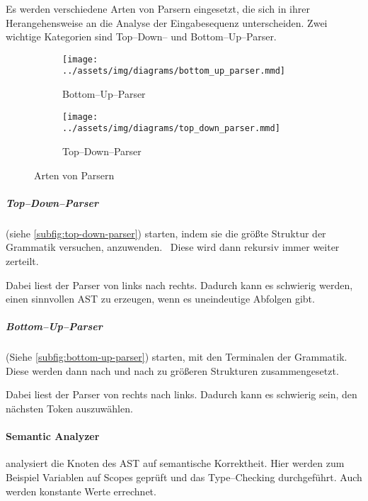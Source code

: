 Es werden verschiedene Arten von Parsern eingesetzt, die sich in ihrer Herangehensweise an die Analyse der Eingabesequenz unterscheiden.
Zwei wichtige Kategorien sind Top--Down-- und Bottom--Up--Parser.
\begin{figure}[ht]
    \begin{subfigure}[c]{0.5\textwidth}
        \begin{center}
            \texttt{[image: ../assets/img/diagrams/bottom\_up\_parser.mmd]}
        \end{center}
        \caption{Bottom--Up--Parser}
        \label{subfig:bottom-up-parser}
    \end{subfigure}
    \begin{subfigure}[c]{0.5\textwidth}
        \begin{center}
            \texttt{[image: ../assets/img/diagrams/top\_down\_parser.mmd]}
        \end{center}
        \caption{Top--Down--Parser}
        \label{subfig:top-down-parser}
    \end{subfigure}
    \caption{Arten von Parsern}
    \label{fig:parser-types}
\end{figure}

\subparagraph{Top--Down--Parser} (siehe \autoref{subfig:top-down-parser}) starten, indem sie die größte Struktur der Grammatik versuchen, anzuwenden.~\autocite{geeksforgeeks-2021A}
Diese wird dann rekursiv immer weiter zerteilt.

Dabei liest der Parser von links nach rechts.
Dadurch kann es schwierig werden, einen sinnvollen \ac{AST} zu erzeugen, wenn es uneindeutige Abfolgen gibt.

\subparagraph{Bottom--Up--Parser} (Siehe \autoref{subfig:bottom-up-parser}) starten, mit den Terminalen der Grammatik.~\autocite{geeksforgeeks-2021B}
Diese werden dann nach und nach zu größeren Strukturen zusammengesetzt.

Dabei liest der Parser von rechts nach links.
Dadurch kann es schwierig sein, den nächsten Token auszuwählen.

\paragraph{Semantic Analyzer} analysiert die Knoten des \ac{AST} auf semantische Korrektheit.
Hier werden zum Beispiel Variablen auf Scopes geprüft und das Type--Checking durchgeführt.
Auch werden konstante Werte errechnet.~\autocite{aho-2006}

